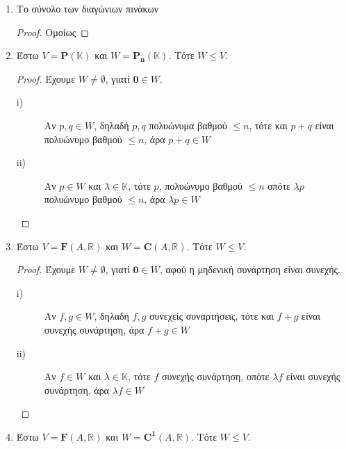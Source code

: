 \begin{examples}
\begin{enumerate}
        \item \textcolor{Col2}{Το σύνολο των διαγώνιων πινάκων}

            \begin{proof}
                Ομοίως
            \end{proof}

        \item Έστω $ V = \mathbf{P}(\mathbb{K}) $ και $ W = \mathbf{P_{n}}(\mathbb{K})$.
            Τότε $ W \leq V $.  
            \begin{proof}
                Έχουμε $ W \neq \emptyset $, γιατί $ \mathbf{0} \in W $.
                \begin{description}
                    \item [i)]
                        Αν $ p, q \in W $, δηλαδή $ p,q $ πολυώνυμα βαθμού $ \leq n $, 
                        τότε και $ p+q $ είναι πολυώνυμο βαθμού $ \leq n $, άρα 
                        $p+q \in W$
                    \item[ii)] Αν $ p \in W $ και $ \lambda \in \mathbb{K} $, τότε 
                        $p$, πολυώνυμο βαθμού $ \leq n $ οπότε $ \lambda p$ πολυώνυμο 
                        βαθμού $ \leq n $, άρα $ \lambda p \in W $
                \end{description}
            \end{proof}

        \item Έστω $ V = \mathbf{F}(A, \mathbb{R}) $ και $ W = 
            \mathbf{C}(A, \mathbb{R}) $.  Τότε $ W \leq V $.  
            \begin{proof}
                Έχουμε $ W \neq \emptyset $, γιατί $ \mathbf{0} \in W $, αφού 
                η μηδενική συνάρτηση είναι συνεχής.
                \begin{description}
                    \item [i)]
                        Αν $ f, g \in W $, δηλαδή $ f,g $ συνεχείς συναρτήσεις, 
                        τότε και $ f+g $ είναι συνεχής συνάρτηση, άρα $f+g \in W$
                    \item[ii)] Αν $ f \in W $ και $ \lambda \in \mathbb{K} $, τότε 
                        $f$ συνεχής συνάρτηση, οπότε $ \lambda f$ είναι 
                        συνεχής συνάρτηση, άρα $ \lambda f \in W $
                \end{description}
            \end{proof}

        \item Έστω $ V = \mathbf{F}(A, \mathbb{R}) $ και $ W = 
            \mathbf{C^{1}}(A, \mathbb{R}) $.  Τότε $ W \leq V $.  


\end{enumerate}
\end{examples}
